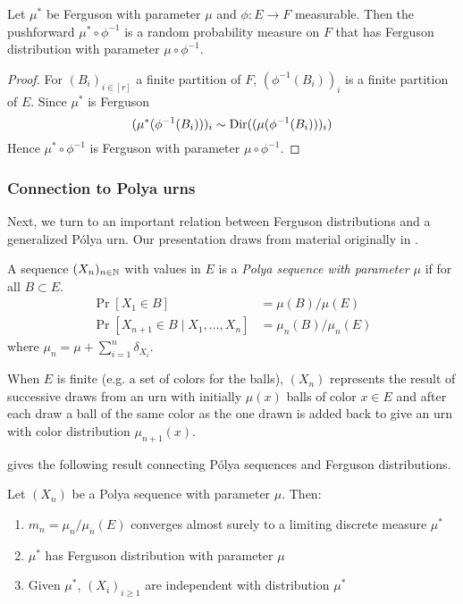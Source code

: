 \begin{lemma}
  Let $\mu^*$ be Ferguson with parameter $\mu$
  and $\phi : E \to F$ measurable.
  Then the pushforward $\mu^* \circ \phi^{-1}$ is a random
  probability measure on $F$ that has Ferguson distribution
  with parameter $\mu \circ \phi^{-1}$.
\end{lemma}

\begin{proof}
  For $(B_i)_{i \in [r]}$ a finite partition of $F$,
  $(\phi^{-1}(B_i))_i$ is a finite partition of $E$.
  Since $\mu^*$ is Ferguson
  \[
    (\mu^*(\phi^{-1}(B_i)))_i
    \sim \mathrm{Dir}( (\mu(\phi^{-1}(B_i)))_i)
  \]
  Hence $\mu^* \circ \phi^{-1}$ is Ferguson with parameter
  $\mu \circ \phi^{-1}$.
\end{proof}

\subsubsection{Connection to Polya urns}

Next, we turn to an important relation between Ferguson distributions and
a generalized P\'olya urn.
Our presentation draws from material originally in
\cite{blackwell1973}.

\begin{definition}
  A sequence $(X_n)_{n \in \mathbb{N}}$ with values in $E$ is
  a \emph{Polya sequence with parameter $\mu$} if
  for all $B \subset E$.
  \begin{align*}
    \Pr[X_1 \in B] &= \mu(B) / \mu(E) \\
    \Pr[X_{n+1} \in B \mid X_1, \ldots, X_n] &= \mu_n(B) / \mu_n(E)
  \end{align*}
  where $\mu_n = \mu + \sum_{i=1}^n \delta_{X_i}$.
\end{definition}

\begin{remark}
  When $E$ is finite (e.g. a set of colors for the balls), $(X_n)$ represents
  the result of successive draws from an urn with initially $\mu(x)$ balls of
  color $x \in E$ and after each draw a ball of the same color as the one drawn
  is added back to give an urn with color distribution $\mu_{n+1}(x)$.
\end{remark}

\cite{blackwell1973} gives the following result connecting P\'olya sequences
and Ferguson distributions.

\begin{theorem}
  Let $(X_n)$ be a Polya sequence with parameter $\mu$. Then:
  \begin{enumerate}
    \item $m_n = \mu_n / \mu_n(E)$ converges almost surely to
      a limiting discrete measure $\mu^*$
    \item $\mu^*$ has Ferguson distribution with parameter $\mu$
    \item Given $\mu^*$, $(X_i)_{i \geq 1}$ are independent with
      distribution $\mu^*$
  \end{enumerate}
\end{theorem}

